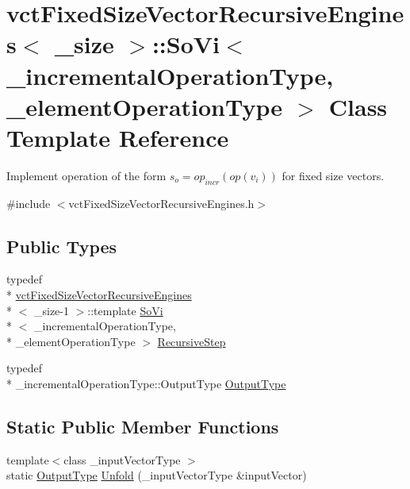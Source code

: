 \hypertarget{classvct_fixed_size_vector_recursive_engines_1_1_so_vi}{\section{vct\-Fixed\-Size\-Vector\-Recursive\-Engines$<$ \-\_\-size $>$\-:\-:So\-Vi$<$ \-\_\-incremental\-Operation\-Type, \-\_\-element\-Operation\-Type $>$ Class Template Reference}
\label{classvct_fixed_size_vector_recursive_engines_1_1_so_vi}
}


Implement operation of the form $s_o = op_{incr}(op(v_i))$ for fixed size vectors.  




{\ttfamily \#include $<$vct\-Fixed\-Size\-Vector\-Recursive\-Engines.\-h$>$}

\subsection*{Public Types}
\begin{DoxyCompactItemize}
\item 
typedef \\*
\hyperlink{classvct_fixed_size_vector_recursive_engines}{vct\-Fixed\-Size\-Vector\-Recursive\-Engines}\\*
$<$ \-\_\-size-\/1 $>$\-::template \hyperlink{classvct_fixed_size_vector_recursive_engines_1_1_so_vi}{So\-Vi}\\*
$<$ \-\_\-incremental\-Operation\-Type, \\*
\-\_\-element\-Operation\-Type $>$ \hyperlink{classvct_fixed_size_vector_recursive_engines_1_1_so_vi_aad1f6b97a64a704bf2d21d95fb834c9b}{Recursive\-Step}
\item 
typedef \\*
\-\_\-incremental\-Operation\-Type\-::\-Output\-Type \hyperlink{classvct_fixed_size_vector_recursive_engines_1_1_so_vi_ae988d4e7479fa6cd314b1103f6a9aeab}{Output\-Type}
\end{DoxyCompactItemize}
\subsection*{Static Public Member Functions}
\begin{DoxyCompactItemize}
\item 
{\footnotesize template$<$class \-\_\-input\-Vector\-Type $>$ }\\static \hyperlink{classvct_fixed_size_vector_recursive_engines_1_1_so_vi_ae988d4e7479fa6cd314b1103f6a9aeab}{Output\-Type} \hyperlink{classvct_fixed_size_vector_recursive_engines_1_1_so_vi_a6dad9d6ad0d8265170c4a6e0eb5f7982}{Unfold} (\-\_\-input\-Vector\-Type \&input\-Vector)
\end{DoxyCompactItemize}


